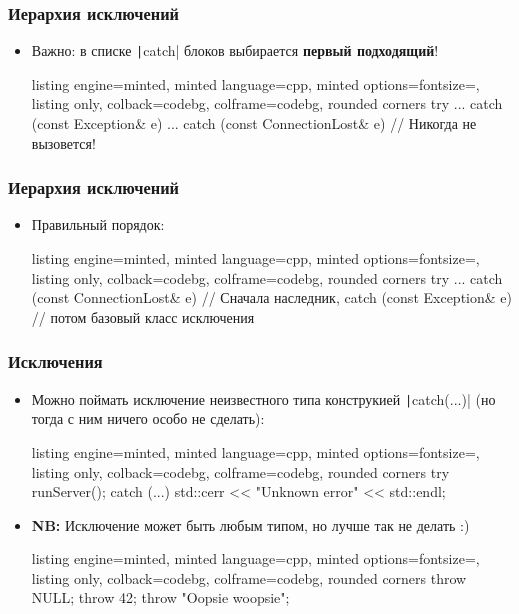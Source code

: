 \documentclass[10pt]{beamer}
\begin{document}
\begin{frame}[fragile]
\frametitle{Иерархия исключений}
\begin{itemize}
\item Важно: в списке \texttt|catch| блоков выбирается \textbf{первый подходящий}!
\begin{tcblisting}{listing engine=minted, minted language=cpp, minted options={fontsize=\scriptsize}, listing only, colback=codebg, colframe=codebg, rounded corners}
try {
  ...
}
catch (const Exception& e) {
  ...
}
catch (const ConnectionLost& e) {
  // Никогда не вызовется!
}
\end{tcblisting}
\end{itemize}
\end{frame}

\begin{frame}[fragile]
\frametitle{Иерархия исключений}
\begin{itemize}
\item Правильный порядок:
\begin{tcblisting}{listing engine=minted, minted language=cpp, minted options={fontsize=\scriptsize}, listing only, colback=codebg, colframe=codebg, rounded corners}
try {
  ...
}
catch (const ConnectionLost& e) {
  // Сначала наследник,
}
catch (const Exception& e) {
  // потом базовый класс исключения
}
\end{tcblisting}
\end{itemize}
\end{frame}

\begin{frame}[fragile]
\frametitle{Исключения}
\begin{itemize}
\item Можно поймать исключение неизвестного типа конструкией \texttt|catch(...)| (но тогда с ним ничего особо не сделать):
\begin{tcblisting}{listing engine=minted, minted language=cpp, minted options={fontsize=\scriptsize}, listing only, colback=codebg, colframe=codebg, rounded corners}
try {
  runServer();
}
catch (...) {
  std::cerr << "Unknown error" << std::endl;
}
\end{tcblisting}
\pause
\item \textbf{NB:} Исключение может быть любым типом, но лучше так не делать :)
\begin{tcblisting}{listing engine=minted, minted language=cpp, minted options={fontsize=\scriptsize}, listing only, colback=codebg, colframe=codebg, rounded corners}
throw NULL;
throw 42;
throw "Oopsie woopsie";
\end{tcblisting}
\end{itemize}
\end{frame}
\end{document}
